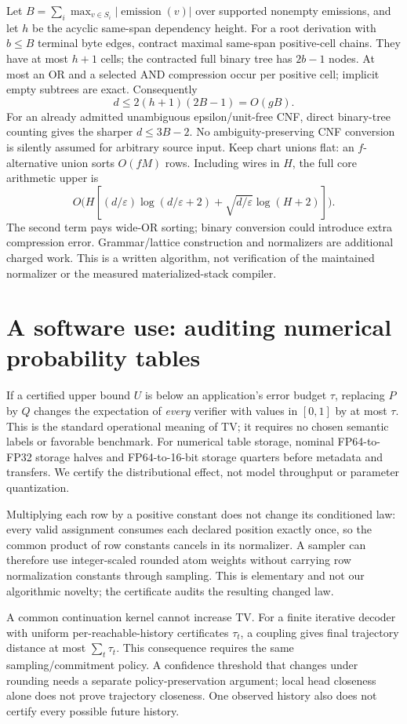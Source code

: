 \documentclass[11pt]{article}
\begin{document}
Let $B=\sum_i\max_{v\in S_i}|\operatorname{emission}(v)|$ over supported
nonempty emissions, and let $h$ be the acyclic same-span dependency height.
For a root derivation with $b\leq B$ terminal byte edges, contract maximal
same-span positive-cell chains. They have at most $h+1$ cells; the contracted
full binary tree has $2b-1$ nodes. At most an OR and a selected AND compression
occur per positive cell; implicit empty subtrees are exact. Consequently
\[
 d\leq2(h+1)(2B-1)=O(gB).
\]
For an already admitted unambiguous epsilon/unit-free CNF, direct binary-tree
counting gives the sharper $d\leq3B-2$. No ambiguity-preserving CNF conversion
is silently assumed for arbitrary source input. Keep chart unions flat:
an $f$-alternative union sorts $O(fM)$ rows. Including wires in $H$, the full
core arithmetic upper is
\[
 O\bigl(H[(d/\varepsilon)\log(d/\varepsilon+2)
       +\sqrt{d/\varepsilon}\log(H+2)]\bigr).
\]
The second term pays wide-OR sorting; binary conversion could introduce
extra compression error. Grammar/lattice construction and normalizers are
additional charged work. This is a written algorithm, not verification of
the maintained normalizer or the measured materialized-stack compiler.


\section{A software use: auditing numerical probability tables}
If a certified upper bound $U$ is below an application's error budget $\tau$,
replacing $P$ by $Q$ changes the expectation of \emph{every} verifier with
values in $[0,1]$ by at most $\tau$. This is the standard operational meaning
of TV; it requires no chosen semantic labels or favorable benchmark.
For numerical table storage, nominal FP64-to-FP32 storage halves and
FP64-to-16-bit storage quarters before metadata and transfers. We certify
the distributional effect, not model throughput or parameter quantization.

Multiplying each row by a positive constant does not change its conditioned
law: every valid assignment consumes each declared position exactly once,
so the common product of row constants cancels in its normalizer. A sampler
can therefore use integer-scaled rounded atom weights without carrying row
normalization constants through sampling. This is elementary and not our
algorithmic novelty; the certificate audits the resulting changed law.

A common continuation kernel cannot increase TV. For a finite iterative
decoder with uniform per-reachable-history certificates $\tau_t$, a coupling
gives final trajectory distance at most $\sum_t\tau_t$. This consequence
requires the same sampling/commitment policy. A confidence threshold that
changes under rounding needs a separate policy-preservation argument; local
head closeness alone does not prove trajectory closeness. One observed
history also does not certify every possible future history.
\end{document}
